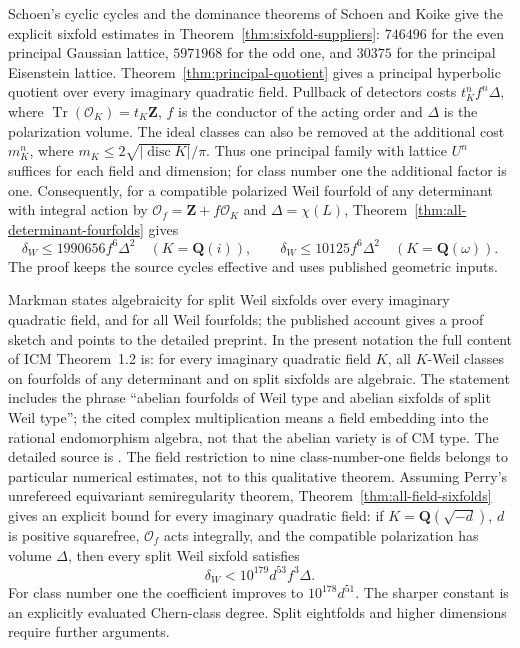 \documentclass[11pt]{article}
\theoremstyle{definition}
\theoremstyle{remark}
\newcommand{\Q}{\mathbf Q}
\newcommand{\Z}{\mathbf Z}
\begin{document}
Schoen's cyclic cycles and the dominance theorems of Schoen and Koike give the explicit sixfold estimates in Theorem~\ref{thm:sixfold-suppliers}: $746496$ for the even principal Gaussian lattice, $5971968$ for the odd one, and $30375$ for the principal Eisenstein lattice. Theorem~\ref{thm:principal-quotient} gives a principal hyperbolic quotient over every imaginary quadratic field. Pullback of detectors costs $t_K^nf^n\Delta$, where $\operatorname{Tr}(\mathcal O_K)=t_K\Z$, $f$ is the conductor of the acting order and $\Delta$ is the polarization volume. The ideal classes can also be removed at the additional cost $m_K^n$, where $m_K\le2\sqrt{|\operatorname{disc}K|}/\pi$. Thus one principal family with lattice $U^n$ suffices for each field and dimension; for class number one the additional factor is one. Consequently, for a compatible polarized Weil fourfold of any determinant with integral action by $\mathcal O_f=\Z+f\mathcal O_K$ and $\Delta=\chi(L)$, Theorem~\ref{thm:all-determinant-fourfolds} gives
\[
 \delta_W\le1990656 f^6\Delta^2\quad(K=\Q(i)),
 \qquad\delta_W\le10125 f^6\Delta^2\quad(K=\Q(\omega)).
\]
The proof keeps the source cycles effective and uses published geometric inputs.

Markman \cite[Theorem~1.2, p.~587]{MarkmanICM} states algebraicity for split Weil sixfolds over every imaginary quadratic field, and for all Weil fourfolds; the published account gives a proof sketch and points to the detailed preprint. In the present notation the full content of ICM Theorem~1.2 is:
for every imaginary quadratic field $K$, all $K$-Weil classes on
fourfolds of any determinant and on split sixfolds are algebraic.
The statement includes the phrase ``abelian fourfolds of Weil type
and abelian sixfolds of split Weil type''; the cited complex
multiplication means a field embedding into the rational endomorphism
algebra, not that the abelian variety is of CM type.
The detailed source is \cite[Theorem~1.5.1 and Corollary~1.6.1,
p.~9; \S9.3]{MarkmanSecant}.
The field restriction to nine class-number-one fields belongs to particular numerical estimates, not to this qualitative theorem. Assuming Perry's unrefereed equivariant semiregularity theorem, Theorem~\ref{thm:all-field-sixfolds} gives an explicit bound for every imaginary quadratic field: if $K=\Q(\sqrt{-d})$, $d$ is positive squarefree, $\mathcal O_f$ acts integrally, and the compatible polarization has volume $\Delta$, then every split Weil sixfold satisfies
\[
 \delta_W<10^{179}d^{53}f^3\Delta.
\]
For class number one the coefficient improves to $10^{178}d^{51}$. The sharper constant is an explicitly evaluated Chern-class degree. Split eightfolds and higher dimensions require further arguments.
\end{document}

